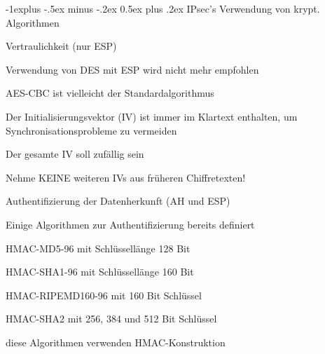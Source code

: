 \documentclass[a4paper]{article}
\makeatletter
\renewcommand{\subsection}{\@startsection{subsection}{2}{0mm}%
 {-1explus -.5ex minus -.2ex}%
 {0.5ex plus .2ex}%
 {\normalfont\normalsize\bfseries}}
\makeatother
\begin{document}
\begin{multicols}{3}
      \subsection{IPsec's Verwendung von krypt. Algorithmen}
      \begin{itemize*}
            \item Vertraulichkeit (nur ESP)
            \begin{itemize*}
                  \item Verwendung von DES mit ESP wird nicht mehr empfohlen
                  \item AES-CBC ist vielleicht der Standardalgorithmus
                  \item Der Initialisierungsvektor (IV) ist immer im Klartext enthalten, um Synchronisationsprobleme zu vermeiden
                  \item Der gesamte IV soll zufällig sein
                  \item Nehme KEINE weiteren IVs aus früheren Chiffretexten!
            \end{itemize*}
            \item Authentifizierung der Datenherkunft (AH und ESP)
            \begin{itemize*}
                  \item Einige Algorithmen zur Authentifizierung bereits definiert
                  \begin{itemize*}
                        \item HMAC-MD5-96 mit Schlüssellänge 128 Bit
                        \item HMAC-SHA1-96 mit Schlüssellänge 160 Bit
                        \item HMAC-RIPEMD160-96 mit 160 Bit Schlüssel
                        \item HMAC-SHA2 mit 256, 384 und 512 Bit Schlüssel
                  \end{itemize*}
                  \item diese Algorithmen verwenden HMAC-Konstruktion
                  \begin{itemize*}

\end{itemize*}
\end{itemize*}
\end{itemize*}
\end{multicols}
\end{document}
